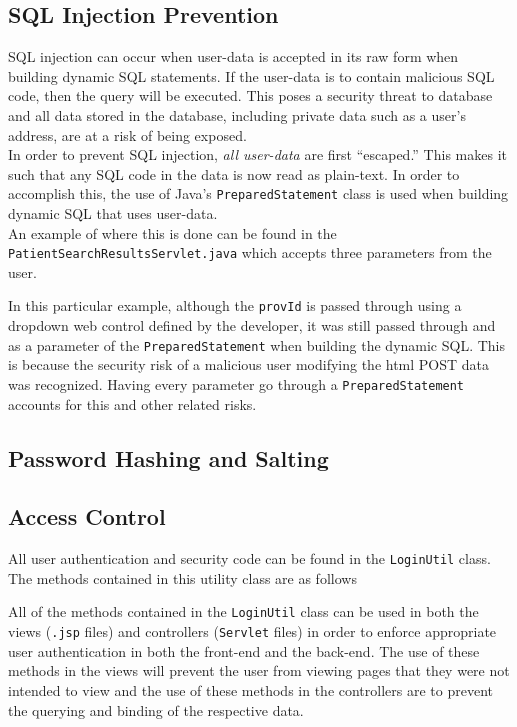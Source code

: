 \documentclass{article}
\begin{document}
\subsection{SQL Injection Prevention}
SQL injection can occur when user-data is accepted in its raw form when building dynamic SQL statements. If the user-data is to contain malicious SQL code, then the query will be executed. This poses a security threat to database and all data stored in the database, including private data such as a user's address, are at a risk of being exposed. \\

In order to prevent SQL injection, \textit{all user-data} are first ``escaped.'' This makes it such that any SQL code in the data is now read as plain-text. In order to accomplish this, the use of Java's \texttt{PreparedStatement} class is used when building dynamic SQL that uses user-data. \\

An example of where this is done can be found in the \texttt{PatientSearchResultsServlet.java} which accepts three parameters from the user.



In this particular example, although the \texttt{provId} is passed through using a dropdown web control defined by the developer, it was still passed through and as a parameter of the \texttt{PreparedStatement} when building the dynamic SQL. This is because the security risk of a malicious user modifying the html POST data was recognized. Having every parameter go through a \texttt{PreparedStatement} accounts for this and other related risks.

\subsection{Password Hashing and Salting}
\subsection{Access Control}
All user authentication and security code can be found in the \texttt{LoginUtil} class. The methods contained in this utility class are as follows



All of the methods contained in the \texttt{LoginUtil} class can be used in both the views (\texttt{.jsp} files) and controllers (\texttt{Servlet} files) in order to enforce appropriate user authentication in both the front-end and the back-end. The use of these methods in the views will prevent the user from viewing pages that they were not intended to view and the use of these methods in the controllers are to prevent the querying and binding of the respective data. \\
\end{document}
